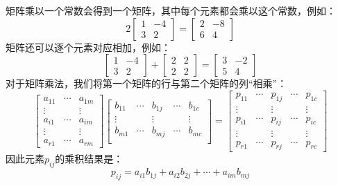 矩阵乘以一个常数会得到一个矩阵，其中每个元素都会乘以这个常数，例如：
\[
  2\left[\begin{array}{rr}
      1 & -4 \\
      3 & 2
    \end{array}\right]=\left[\begin{array}{rr}
      2 & -8 \\
      6 & 4
    \end{array}\right]
\]
矩阵还可以逐个元素对应相加，例如：
\[
  \left[\begin{array}{rr}
      1 & -4 \\
      3 & 2
    \end{array}\right]+\left[\begin{array}{ll}
      2 & 2 \\
      2 & 2
    \end{array}\right]=\left[\begin{array}{rr}
      3 & -2 \\
      5 & 4
    \end{array}\right]
\]
对于矩阵乘法，我们将第一个矩阵的行与第二个矩阵的列“相乘”：
\[
  \begin{bmatrix}
    a_{11} & \cdots & a_{1m} \\
    \vdots &        & \vdots \\
    a_{i1} & \cdots & a_{im} \\
    \vdots &        & \vdots \\
    a_{r1} & \cdots & a_{rm}
  \end{bmatrix}
  \begin{bmatrix}
    b_{11} & \cdots & b_{1j} & \cdots & b_{1c} \\
    \vdots &        & \vdots &        & \vdots \\
    b_{m1} & \cdots & b_{mj} & \cdots & b_{mc} \\
  \end{bmatrix}
  =
  \begin{bmatrix}
    p_{11} & \cdots & p_{1j} & \cdots & p_{1c} \\
    \vdots &        & \vdots &        & \vdots \\
    p_{i1} & \cdots & p_{ij} & \cdots & p_{ic} \\
    \vdots &        & \vdots &        & \vdots \\
    p_{r1} & \cdots & p_{rj} & \cdots & p_{rc}
  \end{bmatrix}
\]
因此元素$p_{ij}$的乘积结果是：
\begin{equation}
  p_{ij} = a_{i1}b_{1j} + a_{i2}b_{2j}+ \cdots + a_{im}b_{mj}
\end{equation}
